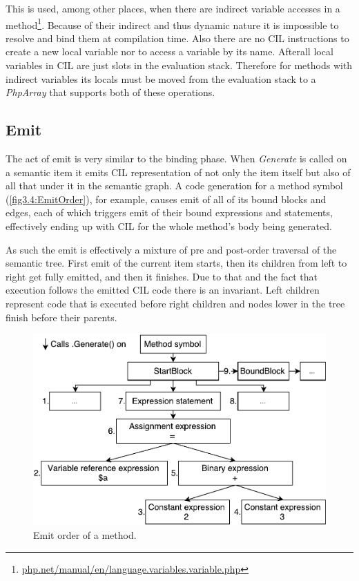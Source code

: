 This is used, among other places, when there are indirect variable accesses in a method\footnote{\href{http://php.net/manual/en/language.variables.variable.php}{php.net/manual/en/language.variables.variable.php}}. Because of their indirect and thus dynamic nature it is impossible to resolve and bind them at compilation time. Also there are no CIL instructions to create a new local variable nor to access a variable by its name. Afterall local variables in CIL are just slots in the evaluation stack. Therefore for methods with indirect variables its locals must be moved from the evaluation stack to a \emph{PhpArray} that supports both of these operations.

\subsection{Emit}

The act of emit is very similar to the binding phase. When \emph{Generate} is called on a semantic item it emits CIL representation of not only the item itself but also of all that under it in the semantic graph. A code generation for a method symbol (\autoref{fig3.4:EmitOrder}), for example, causes emit of all of its bound blocks and edges, each of which triggers emit of their bound expressions and statements, effectively ending up with CIL for the whole method’s body being generated. 

As such the emit is effectively a mixture of pre and post-order traversal of the semantic tree. First emit of the current item starts, then its children from left to right get fully emitted, and then it finishes. Due to that and the fact that execution follows the emitted CIL code there is an invariant. Left children represent code that is executed before right children and nodes lower in the tree finish before their parents. 

\begin{figure}[h]
	\centering	
	\includegraphics[scale=0.75]{../img/3_4_emitorder}	
	\caption{Emit order of a method.}
	\label{fig3.4:EmitOrder}
\end{figure}

